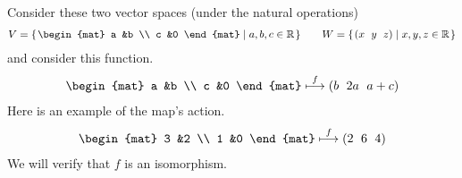 \documentclass[9pt,t]{beamer}
\begin{document}
\begin{frame}
\ex Consider these two vector spaces (under the natural operations)
\begin{equation*}
  V=\set{
    \begin{mat}
      a &b \\
      c &0
    \end{mat}
    \suchthat a,b,c\in\Re}
  \qquad
  W=\set{\rowvec{x &y &z}\suchthat x,y,z\in\Re}
\end{equation*}
and consider this function.
\begin{equation*}
  \begin{mat}
    a &b \\
    c &0
  \end{mat}
  \mapsunder{f}
  \rowvec{b &2a &a+c}
\end{equation*}
Here is an example of the map's action.
\begin{equation*}
  \begin{mat}
    3 &2 \\
    1 &0
  \end{mat}
  \mapsunder{f}
  \rowvec{2 &6 &4}
\end{equation*}
We will verify that $f$
is an isomorphism.
\end{frame}
\end{document}
